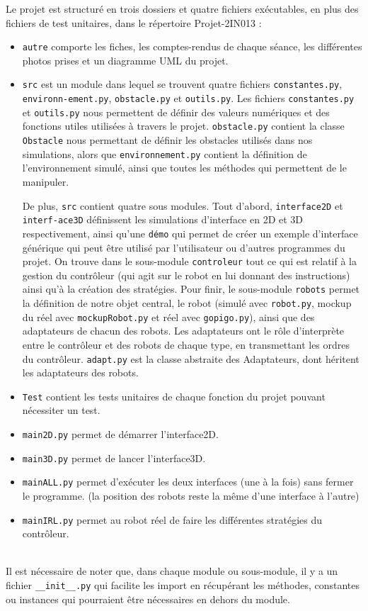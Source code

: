 \documentclass[12pt]{article}
\begin{document}
Le projet est structuré en trois dossiers et quatre fichiers exécutables, en plus des fichiers de test unitaires, dans le répertoire Projet-2IN013 :
\begin{itemize}[label=-]
    \item \texttt{autre} comporte les fiches, les comptes-rendus de chaque séance, les différentes photos prises et un diagramme UML du projet.
    \item \texttt{src} est un module dans lequel se trouvent quatre fichiers \texttt{constantes.py}, \texttt{environn-ement.py}, \texttt{obstacle.py} et \texttt{outils.py}. Les fichiers \texttt{constantes.py} et \texttt{outils.py} nous permettent de définir des valeurs numériques et des fonctions utiles utilisées à travers le projet. \texttt{obstacle.py} contient la classe \texttt{Obstacle} nous permettant de définir les obstacles utilisés dans nos simulations, alors que \texttt{environnement.py} contient la définition de l'environnement simulé, ainsi que toutes les méthodes qui permettent de le manipuler.
    
    De plus, \texttt{src} contient quatre sous modules. Tout d'abord, \texttt{interface2D} et \texttt{interf-ace3D} définissent les simulations d'interface en 2D et 3D respectivement, ainsi qu'une \texttt{démo} qui permet de créer un exemple d'interface générique qui peut être utilisé par l'utilisateur ou d'autres programmes du projet. On trouve dans le sous-module \texttt{controleur} tout ce qui est relatif à la gestion du contrôleur (qui agit sur le robot en lui donnant des instructions) ainsi qu'à la création des stratégies. Pour finir, le sous-module \texttt{robots} permet la définition de notre objet central, le robot (simulé avec \texttt{robot.py}, mockup du réel avec \texttt{mockupRobot.py} et réel avec \texttt{gopigo.py}), ainsi que des adaptateurs de chacun des robots. Les adaptateurs ont le rôle d'interprète entre le contrôleur et des robots de chaque type, en transmettant les ordres du contrôleur. \texttt{adapt.py} est la classe abstraite des Adaptateurs, dont héritent les adaptateurs des robots.
    
    \item \texttt{Test} contient les tests unitaires de chaque fonction du projet pouvant nécessiter un test.
    \item \texttt{main2D.py} permet de démarrer l'interface2D.
    \item \texttt{main3D.py} permet de lancer l'interface3D.
    \item \texttt{mainALL.py} permet d'exécuter les deux interfaces (une à la fois) sans fermer le programme. (la position des robots reste la même d'une interface à l'autre)
    \item \texttt{mainIRL.py} permet au robot réel de faire les différentes stratégies du contrôleur.
\end{itemize}
\\
Il est nécessaire de noter que, dans chaque module ou sous-module, il y a un fichier \texttt{\_\_init\_\_.py} qui facilite les import en récupérant les méthodes, constantes ou instances qui pourraient être nécessaires en dehors du module.
\end{document}
